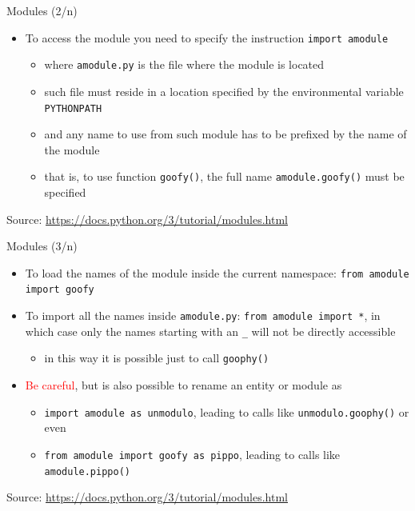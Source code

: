 \documentclass{beamer}
\begin{document}
\begin{frame}[fragile]
{\centerline{Modules (2/n)}}
\begin{itemize}
        \item To access the module you need to specify the instruction \texttt{import amodule} 
               \begin{itemize}
		\item where \texttt{amodule.py} is the file where the module is located
		\item such file must reside in a location specified by the environmental variable \texttt{PYTHONPATH}
		\item and any name to use from such module has to be prefixed by the name of the module
		\item that is, to use function \texttt{goofy()}, the full name \texttt{amodule.goofy()} must be specified
	     \end{itemize}	 
    \end{itemize}
    \begin{center}
	\tiny Source: \url{https://docs.python.org/3/tutorial/modules.html}
    \end{center}
\end{frame}

\begin{frame}[fragile]
{\centerline{Modules (3/n)}}
\begin{itemize}
	 \item To load the names of the module inside the current namespace: \texttt{from amodule import goofy}
	 \item To import all the names inside \texttt{amodule.py}:  \texttt{from amodule import *}, in which case only the names starting with an \texttt{\_} will not be directly accessible
               \begin{itemize}
		\item in this way it is possible just to call \texttt{goophy()}
              \end{itemize}
	 \item \textcolor{red}{Be careful}, but is also possible to rename an entity or module as 
	       \begin{itemize}
		  \item \texttt{import amodule as unmodulo}, leading to calls like \texttt{unmodulo.goophy()} or even
		  \item  \texttt{from amodule import goofy as pippo}, leading to calls like \texttt{amodule.pippo()}
              \end{itemize}
    \end{itemize}
    \begin{center}
	\tiny Source: \url{https://docs.python.org/3/tutorial/modules.html}
    \end{center}
\end{frame}
\end{document}
